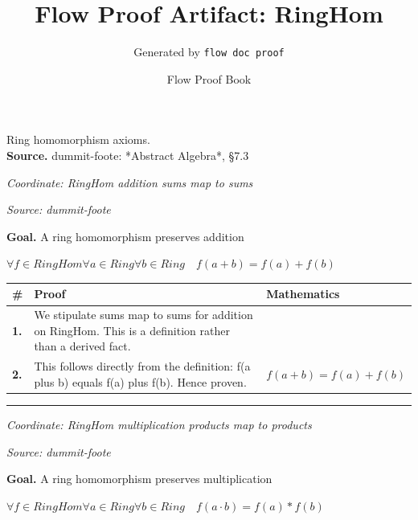 \documentclass[11pt]{article}
\title{Flow Proof Artifact: RingHom}
\author{Generated by \texttt{flow doc proof}}
\date{Flow Proof Book}
\theoremstyle{definition}
\begin{document}
\maketitle
Ring homomorphism axioms.\\[0.5em]
\textbf{Source.} dummit-foote: *Abstract Algebra*, §7.3\\[0.5em]
\bigskip
{}\par
\smallskip\noindent\textit{Coordinate: RingHom \cdot addition \cdot sums map to sums}\par
\smallskip\noindent\textit{Source: dummit-foote}\par
\medskip
\noindent\textbf{Goal.} A ring homomorphism preserves addition\par
\noindent$\displaystyle \forall f \in RingHom \forall a \in Ring \forall b \in Ring\quad f(a + b) = f(a) + f(b)$\par
\medskip
\noindent
\begin{tabular}{@{} >{\raggedright\arraybackslash}p{} >{\raggedright\arraybackslash}p{} >{\raggedleft\arraybackslash}p{} @{}}
\textbf{\#} & \textbf{Proof} & \textbf{Mathematics} \\
\midrule
\textbf{1.} & We stipulate sums map to sums for addition on RingHom. This is a definition rather than a derived fact. & \\[0.45em]
\textbf{2.} & This follows directly from the definition: f(a plus b) equals f(a) plus f(b). Hence proven. & $\displaystyle f(a + b) = f(a) + f(b)$ \\[0.45em]
\bottomrule
\end{tabular}
\label{thm:RingHom-addition-sums_map_to_sums}
\par\medskip\hrule
\bigskip
{}\par
\smallskip\noindent\textit{Coordinate: RingHom \cdot multiplication \cdot products map to products}\par
\smallskip\noindent\textit{Source: dummit-foote}\par
\medskip
\noindent\textbf{Goal.} A ring homomorphism preserves multiplication\par
\noindent$\displaystyle \forall f \in RingHom \forall a \in Ring \forall b \in Ring\quad f(a \cdot b) = f(a) * f(b)$\par
\end{document}
